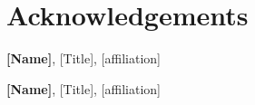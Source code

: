 \section*{Acknowledgements}

\textbf{[Name]}, [Title], [affiliation] \newline
[text]

\textbf{[Name]}, [Title], [affiliation] \newline
[text]

